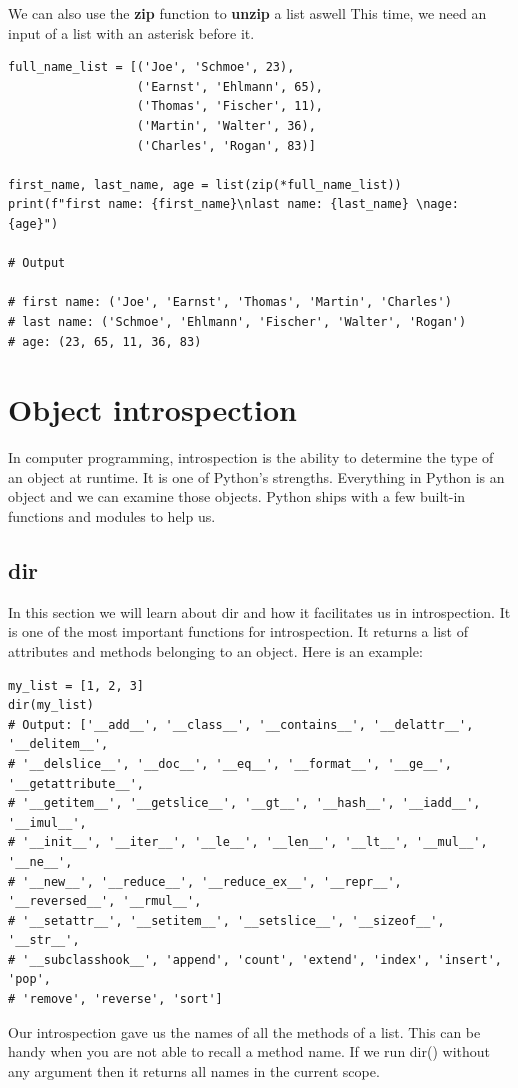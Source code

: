\documentclass{report}
\begin{document}
    \bigbreak \noindent 
    We can also use the \textbf{zip} function to \textbf{unzip} a list aswell This time, we need an input of a list with an asterisk before it.
    \begin{verbatim}
full_name_list = [('Joe', 'Schmoe', 23),
                  ('Earnst', 'Ehlmann', 65),
                  ('Thomas', 'Fischer', 11),
                  ('Martin', 'Walter', 36),
                  ('Charles', 'Rogan', 83)]

first_name, last_name, age = list(zip(*full_name_list))
print(f"first name: {first_name}\nlast name: {last_name} \nage: {age}")

# Output

# first name: ('Joe', 'Earnst', 'Thomas', 'Martin', 'Charles')
# last name: ('Schmoe', 'Ehlmann', 'Fischer', 'Walter', 'Rogan')
# age: (23, 65, 11, 36, 83)
    \end{verbatim}



    \pagebreak \bigbreak \noindent \section{Object introspection}
    \bigbreak \noindent
    In computer programming, introspection is the ability to determine the type of an object at runtime. It is one of Python’s strengths. Everything in Python is an object and we can examine those objects. Python ships with a few built-in functions and modules to help us.


    \subsection{dir}
    \bigbreak \noindent
    In this section we will learn about dir and how it facilitates us in introspection.
    \bigbreak \noindent 
    It is one of the most important functions for introspection. It returns a list of attributes and methods belonging to an object. Here is an example:
    \begin{verbatim}
my_list = [1, 2, 3]
dir(my_list)
# Output: ['__add__', '__class__', '__contains__', '__delattr__', '__delitem__',
# '__delslice__', '__doc__', '__eq__', '__format__', '__ge__', '__getattribute__',
# '__getitem__', '__getslice__', '__gt__', '__hash__', '__iadd__', '__imul__',
# '__init__', '__iter__', '__le__', '__len__', '__lt__', '__mul__', '__ne__',
# '__new__', '__reduce__', '__reduce_ex__', '__repr__', '__reversed__', '__rmul__',
# '__setattr__', '__setitem__', '__setslice__', '__sizeof__', '__str__',
# '__subclasshook__', 'append', 'count', 'extend', 'index', 'insert', 'pop',
# 'remove', 'reverse', 'sort']
    \end{verbatim}
    Our introspection gave us the names of all the methods of a list. This can be handy when you are not able to recall a method name. If we run dir() without any argument then it returns all names in the current scope.
\end{document}
